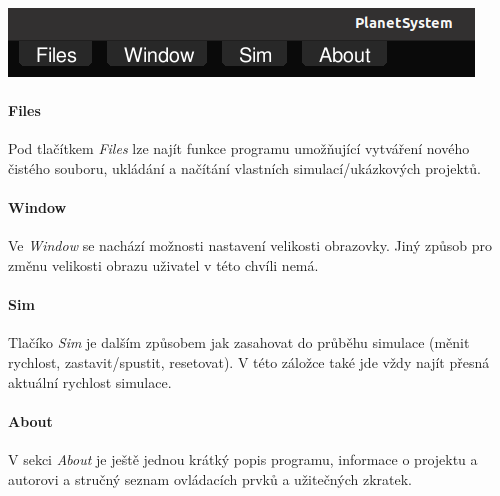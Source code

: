 \documentclass[a4paper, 12pt]{article}
\begin{document}
\begin{center}
\includegraphics[width=0.8\linewidth]{pics/p3_crop.png}
\end{center}

\paragraph{Files}
Pod tlačítkem \emph{Files} lze najít funkce programu umožňující vytváření nového
čistého souboru, ukládání a načítání vlastních simulací/ukázkových projektů.

\paragraph{Window}
Ve \emph{Window} se nachází možnosti nastavení velikosti obrazovky. Jiný způsob
pro změnu velikosti obrazu uživatel v této chvíli nemá.

\paragraph{Sim}
Tlačíko \emph{Sim} je dalším způsobem jak zasahovat do průběhu simulace (měnit
rychlost, zastavit/spustit, resetovat). V této záložce také jde vždy najít
přesná aktuální rychlost simulace.

\paragraph{About}
V sekci \emph{About} je ještě jednou krátký popis programu, informace o
projektu a autorovi a stručný seznam ovládacích prvků a užitečných zkratek.

\pagebreak
\end{document}
